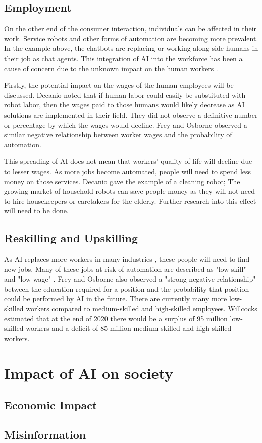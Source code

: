\documentclass[12pt, man]{apa6}
\begin{document}
\subsection*{Employment}
On the other end of the consumer interaction, individuals can be affected in their work.  Service robots and other forms of automation are becoming more prevalent. In the example above, the chatbots are replacing or working along side humans in their job as chat agents.  This integration of AI into the workforce has been a cause of concern due to the unknown impact on the human workers \parencite{DeCanio2016280}.

Firstly, the potential impact on the wages of the human employees will be discussed.  Decanio \parencite*[]{DeCanio2016280} noted that if human labor could easily be substituted with robot labor, then the wages paid to those humans would likely decrease as AI solutions are implemented in their field.  They did not observe a definitive number or percentage by which the wages would decline.  Frey and Osborne \parencite*[]{Frey2017} observed a similar negative relationship between worker wages and the probability of automation.

This spreading of AI does not mean that workers' quality of life will decline due to lesser wages.  As more jobs become automated, people will need to spend less money on those services.  Decanio \parencite*[]{DeCanio2016280} gave the example of a cleaning robot; The growing market of household robots can save people money as they will not need to hire housekeepers or caretakers for the elderly.  Further research into this effect will need to be done.

\subsection*{Reskilling and Upskilling}
As AI replaces more workers in many industries \parencite{Nguyen2022}, these people will need to find new jobs.  Many of these jobs at risk of automation are described as "low-skill" and "low-wage" \parencite[]{Frey2017}.  Frey and Osborne \parencite*[]{Frey2017} also observed a "strong negative relationship" between the education required for a position and the probability that position could be performed by AI in the future.
There are currently many more low-skilled workers compared to medium-skilled and high-skilled employees.  Willcocks \parencite*[]{Willcocks2020} estimated that at the end of 2020 there would be a surplus of 95 million low-skilled workers and a deficit of 85 million medium-skilled and high-skilled workers.



\section*{Impact of AI on society}
\subsection*{Economic Impact}

\subsection*{Misinformation}

\printbibliography
\end{document}
